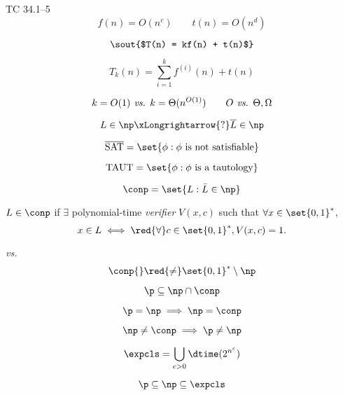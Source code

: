 
\begin{frame}{\p}
  \begin{exampleblock}{TC 34.1--5}
	\[ 
	  f(n) = O(n^c) \qquad t(n) = O(n^d)
	\]
  \end{exampleblock}

  \[
	\hbox{\sout{$T(n) = kf(n) + t(n)$}}
  \]

  \[
	T_{k}(n) = \sum_{i=1}^{k}f^{(i)}(n) + t(n) 
  \]

  \[
	k = O(1) \text{\emph{ vs. }} k = \Theta(n^{O(1)}) \qquad O \emph{\text{ vs. }} \Theta, \Omega
  \]
\end{frame}

\begin{frame}{\conp{}}
  \[
	L \in \np \xLongrightarrow{?} \overline{L} \in \np
  \]

  \[
	\overline{\text{SAT}} = \set{\phi: \phi \text{ is not satisfiable}}
  \]

  \[
	\text{TAUT} = \set{\phi: \phi \text{ is a tautology}}
  \]

  \[
	\conp = \set{L: \bar{L} \in \np}
  \]

  \begin{definition}[\conp]
	$L \in \conp$ if $\exists$ polynomial-time \emph{verifier} $V(x,c)$ such that $\forall x \in \set{0,1}^{\ast}$,
	\[
	  x \in L \iff \red{\forall} c \in \set{0,1}^{\ast}, V(x,c) = 1.
	\]
  \end{definition}
\end{frame}

\begin{frame}{\np{} \emph{vs.} \conp{}}
  \[
	\conp{} \red{\neq} \set{0,1}^{\ast} \setminus \np
  \]

  \[
	\p \subseteq \np \cap \conp
  \]

  \[
	\p = \np \implies \np = \conp
  \]

  \[
	\np \neq \conp \implies \p \neq \np
  \]
\end{frame}

\begin{frame}{\expcls}
  \[
	\expcls = \bigcup_{c > 0} \dtime(2^{n^c})
  \]

  \[
    \p \subseteq \np \subseteq \expcls
  \]
\end{frame}

